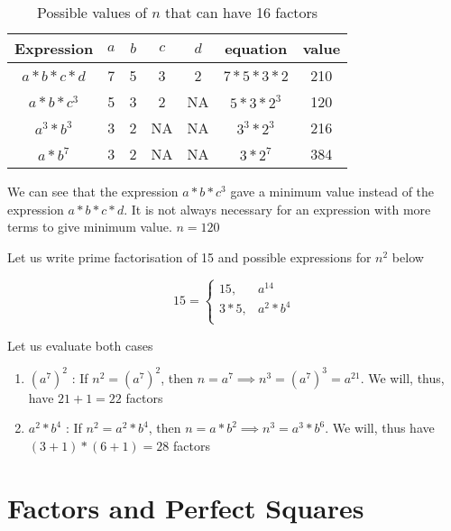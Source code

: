 \begin{table}[h!]
    \centering
    \begin{tabular}{|| c | c | c | c | c | c | c ||}
        \hline
         Expression & $a$ & $b$ & $c$ & $d$ & equation & value  \\
        \hline
        $a * b * c * d$ & 7 & 5 & 3 & 2 & $7 * 5 * 3 * 2$ & 210 \\
        \hline
        $a * b * c^3$ & 5 & 3 & 2 & NA & $5 * 3 * 2^3$ & 120 \\
        \hline
        $a^3 * b^3$ & 3 & 2 & NA & NA & $3^3 * 2^3$ & 216 \\
        \hline
        $a * b^7$ & 3 & 2 & NA & NA & $3 * 2^7$ & 384 \\
        \hline
    \end{tabular}
    \caption{Possible values of $n$ that can have 16 factors}
\end{table}

We can see that the expression $a * b * c^3$ gave a minimum value instead of the expression $a * b * c * d$. It is not always necessary for an expression with more terms to give minimum value. $n = 120$


Let us write prime factorisation of 15 and possible expressions for $n^2$ below

\begin{equation*}
    15 = 
    \begin{cases}
        15, & a^{14} \\
        3 * 5, & a^2 * b^4 \\
    \end{cases}
\end{equation*}

Let us evaluate both cases
\begin{enumerate}
    \item $(a^7)^2$ : If $n^2 = (a^7)^2$, then $n = a^7 \implies n^3 = (a^7)^3 = a^{21}$. We will, thus, have $21 + 1 = 22$ factors
    
    \item $a^2 * b^4$ : If $n^2 = a^2 * b^4$, then $n = a * b^2 \implies n^3 = a^3 * b^6$. We will, thus have $(3+1) * (6+1) = 28$ factors
\end{enumerate}

\section{Factors and Perfect Squares}


